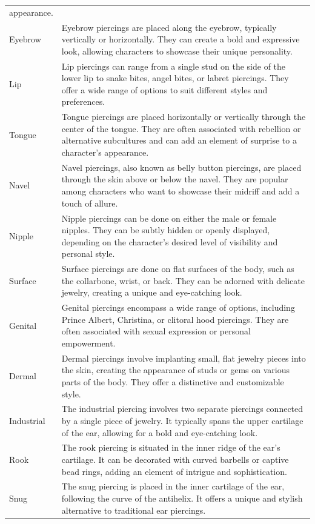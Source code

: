 \begin{longtable}[]{@{}
  >{\raggedright\arraybackslash}p{}
  >{\raggedright\arraybackslash}p{}@{}}
appearance. \\
Eyebrow & Eyebrow piercings are placed along the eyebrow, typically
vertically or horizontally. They can create a bold and expressive look,
allowing characters to showcase their unique personality. \\
Lip & Lip piercings can range from a single stud on the side of the
lower lip to snake bites, angel bites, or labret piercings. They offer a
wide range of options to suit different styles and preferences. \\
Tongue & Tongue piercings are placed horizontally or vertically through
the center of the tongue. They are often associated with rebellion or
alternative subcultures and can add an element of surprise to a
character's appearance. \\
Navel & Navel piercings, also known as belly button piercings, are
placed through the skin above or below the navel. They are popular among
characters who want to showcase their midriff and add a touch of
allure. \\
Nipple & Nipple piercings can be done on either the male or female
nipples. They can be subtly hidden or openly displayed, depending on the
character's desired level of visibility and personal style. \\
Surface & Surface piercings are done on flat surfaces of the body, such
as the collarbone, wrist, or back. They can be adorned with delicate
jewelry, creating a unique and eye-catching look. \\
Genital & Genital piercings encompass a wide range of options, including
Prince Albert, Christina, or clitoral hood piercings. They are often
associated with sexual expression or personal empowerment. \\
Dermal & Dermal piercings involve implanting small, flat jewelry pieces
into the skin, creating the appearance of studs or gems on various parts
of the body. They offer a distinctive and customizable style. \\
Industrial & The industrial piercing involves two separate piercings
connected by a single piece of jewelry. It typically spans the upper
cartilage of the ear, allowing for a bold and eye-catching look. \\
Rook & The rook piercing is situated in the inner ridge of the ear's
cartilage. It can be decorated with curved barbells or captive bead
rings, adding an element of intrigue and sophistication. \\
Snug & The snug piercing is placed in the inner cartilage of the ear,
following the curve of the antihelix. It offers a unique and stylish
alternative to traditional ear piercings. \\
\bottomrule
\end{longtable}

